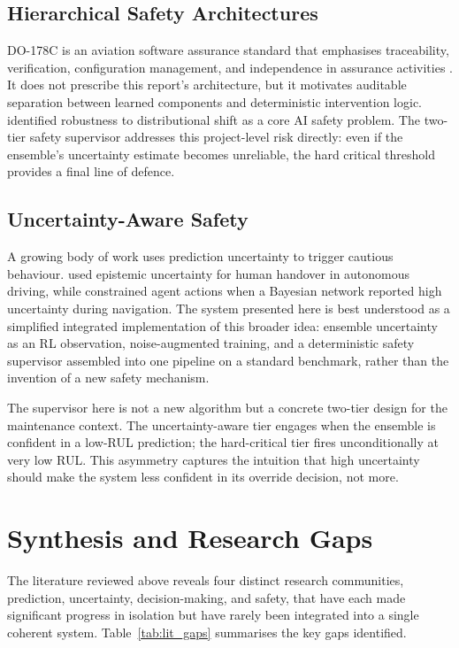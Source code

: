 \documentclass[12pt,a4paper]{report}
\begin{document}
\subsection{Hierarchical Safety Architectures}

DO-178C is an aviation software assurance standard that emphasises traceability, verification, configuration management, and independence in assurance activities \citep{do178c}. It does not prescribe this report's architecture, but it motivates auditable separation between learned components and deterministic intervention logic. \citet{amodei2016concrete} identified robustness to distributional shift as a core AI safety problem. The two-tier safety supervisor addresses this project-level risk directly: even if the ensemble's uncertainty estimate becomes unreliable, the hard critical threshold provides a final line of defence.

\subsection{Uncertainty-Aware Safety}

A growing body of work uses prediction uncertainty to trigger cautious behaviour. \citet{michelmore2020uncertainty} used epistemic uncertainty for human handover in autonomous driving, while \citet{lutjens2019safe} constrained agent actions when a Bayesian network reported high uncertainty during navigation. The system presented here is best understood as a simplified integrated implementation of this broader idea: ensemble uncertainty as an RL observation, noise-augmented training, and a deterministic safety supervisor assembled into one pipeline on a standard benchmark, rather than the invention of a new safety mechanism.


The supervisor here is not a new algorithm but a concrete two-tier design for the maintenance context. The uncertainty-aware tier engages when the ensemble is confident in a low-RUL prediction; the hard-critical tier fires unconditionally at very low RUL. This asymmetry captures the intuition that high uncertainty should make the system less confident in its override decision, not more.

\section{Synthesis and Research Gaps}

The literature reviewed above reveals four distinct research communities, prediction, uncertainty, decision-making, and safety, that have each made significant progress in isolation but have rarely been integrated into a single coherent system. Table~\ref{tab:lit_gaps} summarises the key gaps identified.
\end{document}
